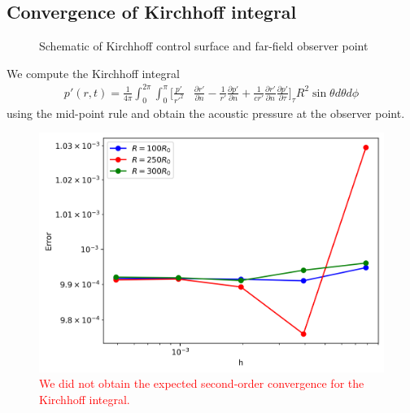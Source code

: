 \documentclass[a4paper]{article}
\begin{document}
\subsection*{Convergence of Kirchhoff integral}
\begin{figure}[!h]
    \centering
    \caption{Schematic of Kirchhoff control surface and far-field observer point}
\end{figure}
We compute the Kirchhoff integral
\begin{equation}
    \begin{split}
        p'(r,t) =  \frac{1}{4\pi}\int_{0}^{2\pi}\int_{0}^{\pi}\Big[  \frac{p'}{r'^{2}}&\frac{\partial r'}{\partial n} - \frac{1}{r'}\frac{\partial p'}{\partial n} + \frac{1}{c r'}\frac{\partial r'}{\partial n}\frac{\partial p'}{\partial \tau} \Big]_{\tau} R^2\sin\theta d\theta d \phi  
    \end{split} 
\end{equation}
using the mid-point rule and obtain the acoustic pressure at the observer point.
\begin{figure}[h!]
    \centering
    \includegraphics[scale=0.7]{images/Convergence.png}
    \caption{\textcolor{red}{We did not obtain the expected second-order convergence for the Kirchhoff integral.}}
\end{figure}
\end{document}

